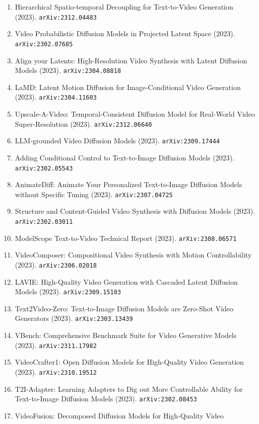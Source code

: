 \documentclass[11pt]{article}
\begin{document}
\begin{enumerate}
  Datasets (2023). \texttt{arXiv:2311.15127}
  \item Hierarchical Spatio-temporal Decoupling for Text-to-Video Generation (2023). \texttt{arXiv:2312.04483}
  \item Video Probabilistic Diffusion Models in Projected Latent Space (2023). \texttt{arXiv:2302.07685}
  \item Align your Latents: High-Resolution Video Synthesis with Latent
  Diffusion Models (2023). \texttt{arXiv:2304.08818}
  \item LaMD: Latent Motion Diffusion for Image-Conditional Video Generation (2023). \texttt{arXiv:2304.11603}
  \item Upscale-A-Video: Temporal-Consistent Diffusion Model for Real-World
  Video Super-Resolution (2023). \texttt{arXiv:2312.06640}
  \item LLM-grounded Video Diffusion Models (2023). \texttt{arXiv:2309.17444}
  \item Adding Conditional Control to Text-to-Image Diffusion Models (2023). \texttt{arXiv:2302.05543}
  \item AnimateDiff: Animate Your Personalized Text-to-Image Diffusion Models
  without Specific Tuning (2023). \texttt{arXiv:2307.04725}
  \item Structure and Content-Guided Video Synthesis with Diffusion Models (2023). \texttt{arXiv:2302.03011}
  \item ModelScope Text-to-Video Technical Report (2023). \texttt{arXiv:2308.06571}
  \item VideoComposer: Compositional Video Synthesis with Motion Controllability (2023). \texttt{arXiv:2306.02018}
  \item LAVIE: High-Quality Video Generation with Cascaded Latent Diffusion
  Models (2023). \texttt{arXiv:2309.15103}
  \item Text2Video-Zero: Text-to-Image Diffusion Models are Zero-Shot Video
  Generators (2023). \texttt{arXiv:2303.13439}
  \item VBench: Comprehensive Benchmark Suite for Video Generative Models (2023). \texttt{arXiv:2311.17982}
  \item VideoCrafter1: Open Diffusion Models for High-Quality Video Generation (2023). \texttt{arXiv:2310.19512}
  \item T2I-Adapter: Learning Adapters to Dig out More Controllable Ability for
  Text-to-Image Diffusion Models (2023). \texttt{arXiv:2302.08453}
  \item VideoFusion: Decomposed Diffusion Models for High-Quality Video

\end{enumerate}
\end{document}
